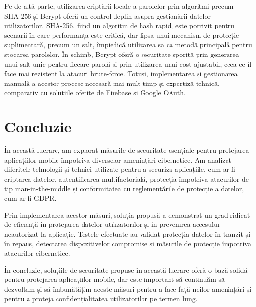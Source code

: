 \documentclass[runningheads]{llncs}
\begin{document}
Pe de altă parte, utilizarea criptării locale a parolelor prin algoritmi precum SHA-256 și Bcrypt oferă un control deplin asupra gestionării datelor utilizatorilor. SHA-256, fiind un algoritm de hash rapid, este potrivit pentru scenarii în care performanța este critică, dar lipsa unui mecanism de protecție suplimentară, precum un salt, împiedică utilizarea sa ca metodă principală pentru stocarea parolelor. În schimb, Bcrypt oferă o securitate sporită prin generarea unui salt unic pentru fiecare parolă și prin utilizarea unui cost ajustabil, ceea ce îl face mai rezistent la atacuri brute-force. Totuși, implementarea și gestionarea manuală a acestor procese necesară mai mult timp și expertiză tehnică, comparativ cu soluțiile oferite de Firebase și Google OAuth.

\section{Concluzie}
În această lucrare, am explorat măsurile de securitate esențiale pentru protejarea aplicațiilor mobile împotriva diverselor amenințări cibernetice. Am analizat diferitele tehnologii și tehnici utilizate pentru a securiza aplicațiile, cum ar fi criptarea datelor, autentificarea multifactorială, protecția împotriva atacurilor de tip man-in-the-middle și conformitatea cu reglementările de protecție a datelor, cum ar fi GDPR.

Prin implementarea acestor măsuri, soluția propusă a demonstrat un grad ridicat de eficiență în protejarea datelor utilizatorilor și în prevenirea accesului neautorizat la aplicație. Testele efectuate au validat protecția datelor în tranzit și în repaus, detectarea dispozitivelor compromise și măsurile de protecție împotriva atacurilor cibernetice.


În concluzie, soluțiile de securitate propuse în această lucrare oferă o bază solidă pentru protejarea aplicațiilor mobile, dar este important să continuăm să dezvoltăm și să îmbunătățim aceste măsuri pentru a face față noilor amenințări și pentru a proteja confidențialitatea utilizatorilor pe termen lung.

%
%



\end{document}
